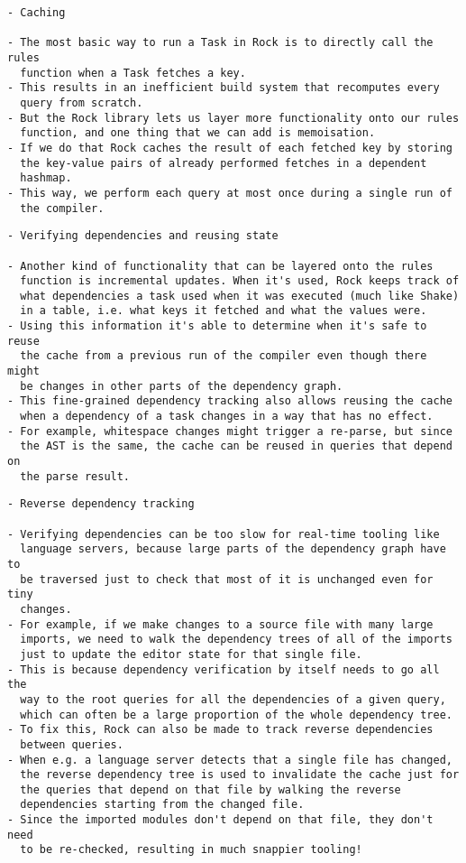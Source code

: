 \documentclass[12pt, a4paper]{report}
\begin{document}
\begin{verbatim}
- Caching

- The most basic way to run a Task in Rock is to directly call the rules
  function when a Task fetches a key.
- This results in an inefficient build system that recomputes every
  query from scratch.
- But the Rock library lets us layer more functionality onto our rules
  function, and one thing that we can add is memoisation.
- If we do that Rock caches the result of each fetched key by storing
  the key-value pairs of already performed fetches in a dependent
  hashmap.
- This way, we perform each query at most once during a single run of
  the compiler.
\end{verbatim}

\begin{verbatim}
- Verifying dependencies and reusing state

- Another kind of functionality that can be layered onto the rules
  function is incremental updates. When it's used, Rock keeps track of
  what dependencies a task used when it was executed (much like Shake)
  in a table, i.e. what keys it fetched and what the values were.
- Using this information it's able to determine when it's safe to reuse
  the cache from a previous run of the compiler even though there might
  be changes in other parts of the dependency graph.
- This fine-grained dependency tracking also allows reusing the cache
  when a dependency of a task changes in a way that has no effect.
- For example, whitespace changes might trigger a re-parse, but since
  the AST is the same, the cache can be reused in queries that depend on
  the parse result.
\end{verbatim}

\begin{verbatim}
- Reverse dependency tracking

- Verifying dependencies can be too slow for real-time tooling like
  language servers, because large parts of the dependency graph have to
  be traversed just to check that most of it is unchanged even for tiny
  changes.
- For example, if we make changes to a source file with many large
  imports, we need to walk the dependency trees of all of the imports
  just to update the editor state for that single file.
- This is because dependency verification by itself needs to go all the
  way to the root queries for all the dependencies of a given query,
  which can often be a large proportion of the whole dependency tree.
- To fix this, Rock can also be made to track reverse dependencies
  between queries.
- When e.g. a language server detects that a single file has changed,
  the reverse dependency tree is used to invalidate the cache just for
  the queries that depend on that file by walking the reverse
  dependencies starting from the changed file.
- Since the imported modules don't depend on that file, they don't need
  to be re-checked, resulting in much snappier tooling!
\end{verbatim}
\end{document}
